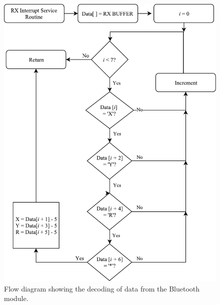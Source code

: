 \begin{figure}[H]
\centering
\includegraphics[scale = 1]{pics/Soft8.pdf}
\caption{Flow diagram showing the decoding of data from the Bluetooth module.}
\label{fig:Soft8}
\end{figure}
